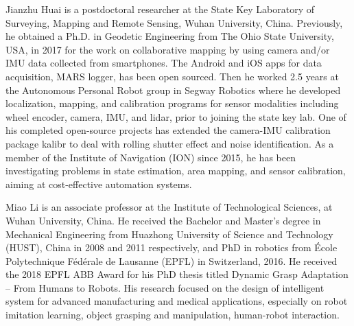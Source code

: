 \documentclass[lettersize,journal]{IEEEtran}
\begin{document}
\begin{IEEEbiography}{Jianzhu Huai}
is a postdoctoral researcher at the State Key Laboratory of Surveying, Mapping and Remote Sensing, Wuhan University, China. Previously, he obtained a Ph.D. in Geodetic Engineering from The Ohio State University, USA, in 2017 for the work on collaborative mapping by using camera and/or IMU data collected from smartphones. The Android and iOS apps for data acquisition, MARS logger, has been open sourced. Then he worked 2.5 years at the Autonomous Personal Robot group in Segway Robotics where he developed localization, mapping, and calibration programs for sensor modalities including wheel encoder, camera, IMU, and lidar, prior to joining the state key lab. One of his completed open-source projects has extended the camera-IMU calibration package kalibr to deal with rolling shutter effect and noise identification. As a member of the Institute of Navigation (ION) since 2015, he has been investigating problems in state estimation, area mapping, and sensor calibration, aiming at cost-effective automation systems.
\end{IEEEbiography}

\begin{IEEEbiography}{Miao Li}
is an associate professor at the Institute of Technological Sciences, at Wuhan University, China. He received the Bachelor and Master’s degree in Mechanical Engineering from Huazhong University of Science and Technology (HUST), China in 2008 and 2011 respectively, and PhD in robotics from École Polytechnique Fédérale de Lausanne (EPFL) in Switzerland, 2016. He received the 2018 EPFL ABB Award for his PhD thesis titled Dynamic Grasp Adaptation – From Humans to Robots. His research focused on the design of intelligent system for advanced manufacturing and medical applications, especially on robot imitation learning, object grasping and manipulation, human-robot interaction.
\end{IEEEbiography}
\end{document}
